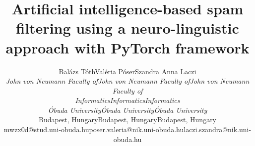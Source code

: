 \documentclass[lettersize,journal]{IEEEtran}
\begin{document}
\title{Artificial intelligence-based spam filtering using a neuro-linguistic approach with PyTorch framework}


\author{%
  \setlength{\tabcolsep}{4em}
  \begin{tabular}{@{}ccc@{}}
      \small{Balázs Tóth} & \small{Valéria Póser} & \small{Szandra Anna Laczi} \\[0ex]
      \small{\it John von Neumann Faculty of} & \small{\it John von Neumann Faculty of} & \small{\it John von Neumann Faculty of} \\[0ex]
      \small{\it Informatics} & \small{\it Informatics} & \small{\it Informatics} \\[0ex]
      \small{\it Óbuda University} & \small{\it Óbuda University} & \small{\it Óbuda University} \\[0ex]
      \small{Budapest, Hungary}  & \small{Budapest, Hungary} & \small{Budapest, Hungary} \\[0ex]
      \small{mwzx0d@stud.uni-obuda.hu}  & \small{poser.valeria@nik.uni-obuda.hu} & \small{laczi.szandra@nik.uni-obuda.hu}
  \end{tabular}
}

\maketitle







% 
% 
\end{document}
